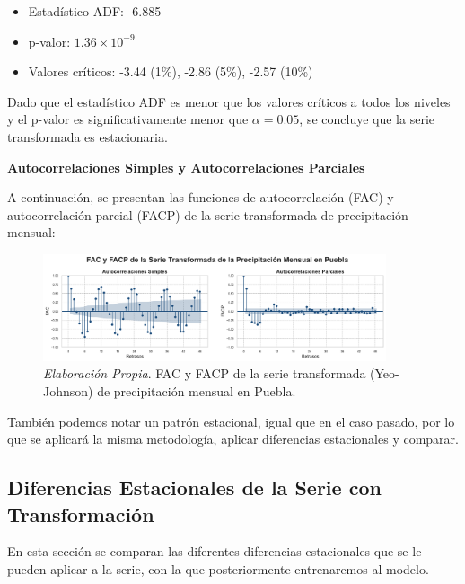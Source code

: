 \documentclass[12pt,letterpaper]{article}   %
\begin{document}
\begin{itemize}
    \item Estadístico ADF: -6.885
    \item p-valor: $1.36 \times 10^{-9}$
    \item Valores críticos: -3.44 (1\%), -2.86 (5\%), -2.57 (10\%)
\end{itemize}


Dado que el estadístico ADF es menor que los valores críticos a todos los niveles y el p-valor es significativamente menor que $\alpha = 0.05$, se concluye que la serie transformada es estacionaria.

\vspace{0.5cm}
\newpage

\textbf{Autocorrelaciones Simples y Autocorrelaciones Parciales}

A continuación, se presentan las funciones de autocorrelación (FAC) y autocorrelación parcial (FACP) de la serie transformada de precipitación mensual:

\begin{figure}[h!]
    \centering
    \includegraphics[width=0.9\textwidth]{imagenes/03-08-acf_pacf.pdf}
    \caption{\textit{Elaboración Propia}. FAC y FACP de la serie transformada (Yeo-Johnson) de precipitación mensual en Puebla.}
    \label{fig:FAC_FACP_yeo}
\end{figure}

También podemos notar un patrón estacional, igual que en el caso pasado, por lo que se aplicará la misma metodología, aplicar diferencias estacionales y comparar.




\newpage
\subsection{Diferencias Estacionales de la Serie con Transformación}

En esta sección se comparan las diferentes diferencias estacionales que se le pueden aplicar a la serie, con la que posteriormente entrenaremos al modelo.
\end{document}
